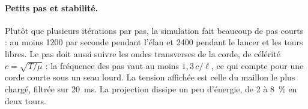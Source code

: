 \paragraph{Petits pas et stabilité.} Plutôt que plusieurs itérations par pas,
la simulation fait beaucoup de pas courts \cite{macklin2019smallsteps} : au
moins \num{1200} par seconde pendant l'élan et \num{2400} pendant le lancer et
les tours libres. Le pas doit aussi suivre les ondes transverses de la corde,
de célérité \(c = \sqrt{T/\mu}\) : la fréquence des pas vaut au moins
\(1{,}3\, c/\ell\), ce qui compte pour une corde courte sous un seau lourd. La
tension affichée est celle du maillon le plus chargé, filtrée sur \SI{20}{ms}.
La projection dissipe un peu d'énergie, de 2 à \SI{8}{\percent} en deux tours.
